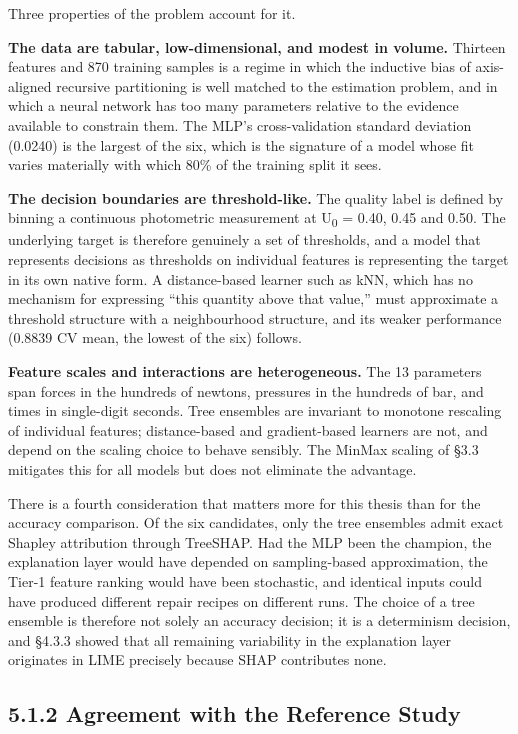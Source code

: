 Three properties of the problem account for it.

\textbf{The data are tabular, low-dimensional, and modest in volume.} Thirteen features and 870 training samples is a regime in which the inductive bias of axis-aligned recursive partitioning is well matched to the estimation problem, and in which a neural network has too many parameters relative to the evidence available to constrain them. The MLP's cross-validation standard deviation (0.0240) is the largest of the six, which is the signature of a model whose fit varies materially with which 80\% of the training split it sees.

\textbf{The decision boundaries are threshold-like.} The quality label is defined by binning a continuous photometric measurement at U\textsubscript{0} = 0.40, 0.45 and 0.50. The underlying target is therefore genuinely a set of thresholds, and a model that represents decisions as thresholds on individual features is representing the target in its own native form. A distance-based learner such as kNN, which has no mechanism for expressing ``this quantity above that value,'' must approximate a threshold structure with a neighbourhood structure, and its weaker performance (0.8839 CV mean, the lowest of the six) follows.

\textbf{Feature scales and interactions are heterogeneous.} The 13 parameters span forces in the hundreds of newtons, pressures in the hundreds of bar, and times in single-digit seconds. Tree ensembles are invariant to monotone rescaling of individual features; distance-based and gradient-based learners are not, and depend on the scaling choice to behave sensibly. The MinMax scaling of §3.3 mitigates this for all models but does not eliminate the advantage.

There is a fourth consideration that matters more for this thesis than for the accuracy comparison. Of the six candidates, only the tree ensembles admit exact Shapley attribution through TreeSHAP. Had the MLP been the champion, the explanation layer would have depended on sampling-based approximation, the Tier-1 feature ranking would have been stochastic, and identical inputs could have produced different repair recipes on different runs. The choice of a tree ensemble is therefore not solely an accuracy decision; it is a determinism decision, and §4.3.3 showed that all remaining variability in the explanation layer originates in LIME precisely because SHAP contributes none.

\hypertarget{agreement-with-the-reference-study}{%
\subsection{5.1.2 Agreement with the Reference Study}\label{agreement-with-the-reference-study}}

